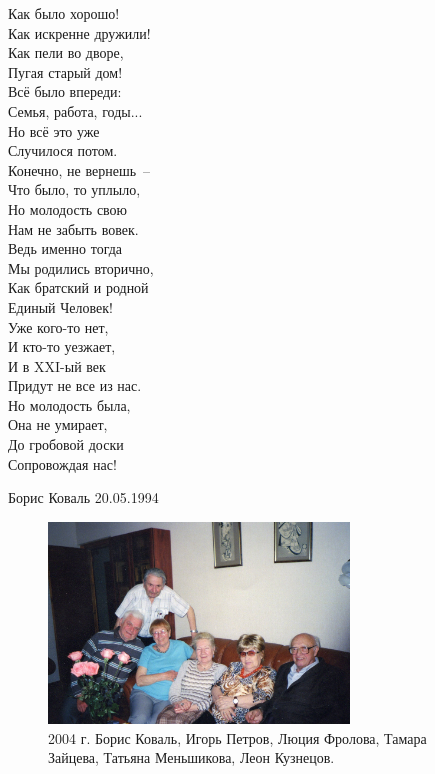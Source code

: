 \begin{multicols}{2}
    \vfill
    \noindent
    Как было хорошо!\\
    Как искренне дружили!\\
    Как пели во дворе,\\
    Пугая старый дом!\\
    \vfill
    \noindent
    Всё было впереди:\\
    Семья, работа, годы...\\
    Но всё это уже\\
    Случилося потом.\\
    \vfill
    \noindent
    Конечно, не вернешь~--\\
    Что было, то уплыло,\\
    Но молодость свою\\
    Нам не забыть вовек.\\
    \vfill
    \noindent
    Ведь именно тогда\\
    Мы родились вторично,\\
    Как братский и родной\\
    Единый Человек!\\
    \vfill
    \noindent
    Уже кого-то нет,\\
    И кто-то уезжает,\\
    И в XXI-ый век\\
    Придут не все из нас.\\
    \vfill
    \noindent
    Но молодость была,\\
    Она не умирает,\\
    До гробовой доски\\
    Сопровождая нас!\\
\end{multicols}
\vspace*{-5mm}

{\raggedleft Борис Коваль 20.05.1994 

}

\newpage

\begin{figure}[h!]
    \includegraphics[width=80mm]{inc/18/1}
    
    \caption{2004 г. Борис Коваль, Игорь Петров, Люция Фролова, Тамара Зайцева, Татьяна Меньшикова, Леон Кузнецов.}
\end{figure}

